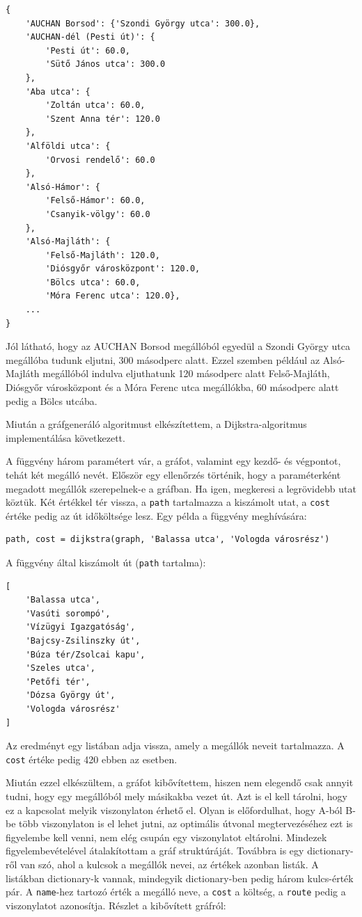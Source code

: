 \begin{verbatim}
{
    'AUCHAN Borsod': {'Szondi György utca': 300.0},
    'AUCHAN-dél (Pesti út)': {
        'Pesti út': 60.0,
        'Sütő János utca': 300.0
    },
    'Aba utca': {
        'Zoltán utca': 60.0,
        'Szent Anna tér': 120.0
    },
    'Alföldi utca': {
        'Orvosi rendelő': 60.0
    },
    'Alsó-Hámor': {
        'Felső-Hámor': 60.0,
        'Csanyik-völgy': 60.0
    },
    'Alsó-Majláth': {
        'Felső-Majláth': 120.0,
        'Diósgyőr városközpont': 120.0,
        'Bölcs utca': 60.0,
        'Móra Ferenc utca': 120.0},
    ...
}
\end{verbatim}

Jól látható, hogy az AUCHAN Borsod megállóból egyedül a Szondi György utca megállóba tudunk eljutni, 300 másodperc alatt. Ezzel szemben például az Alsó-Majláth megállóból indulva eljuthatunk 120 másodperc alatt Felső-Majláth, Diósgyőr városközpont és a Móra Ferenc utca megállókba, 60 másodperc alatt pedig a Bölcs utcába.

Miután a gráfgeneráló algoritmust elkészítettem, a Dijkstra-algoritmus implementálása következett.

A függvény három paramétert vár, a gráfot, valamint egy kezdő- és végpontot, tehát két megálló nevét. Először egy ellenőrzés történik, hogy a paraméterként megadott megállók szerepelnek-e a gráfban. Ha igen, megkeresi a legrövidebb utat köztük. Két értékkel tér vissza, a \texttt{path} tartalmazza a kiszámolt utat, a \texttt{cost} értéke pedig az út időköltsége lesz.
Egy példa a függvény meghívására:

\begin{verbatim}
path, cost = dijkstra(graph, 'Balassa utca', 'Vologda városrész')
\end{verbatim}

A függvény által kiszámolt út (\texttt{path} tartalma):

\begin{verbatim}
[
    'Balassa utca',
    'Vasúti sorompó',
    'Vízügyi Igazgatóság',
    'Bajcsy-Zsilinszky út',
    'Búza tér/Zsolcai kapu',
    'Szeles utca',
    'Petőfi tér',
    'Dózsa György út',
    'Vologda városrész'
]
\end{verbatim}

Az eredményt egy listában adja vissza, amely a megállók neveit tartalmazza. A \texttt{cost} értéke pedig 420 ebben az esetben.

Miután ezzel elkészültem, a gráfot kibővítettem, hiszen nem elegendő csak annyit tudni, hogy egy megállóból mely másikakba vezet út. Azt is el kell tárolni, hogy ez a kapcsolat melyik viszonylaton érhető el. Olyan is előfordulhat, hogy A-ból B-be több viszonylaton is el lehet jutni, az optimális útvonal megtervezéséhez ezt is figyelembe kell venni, nem elég csupán egy viszonylatot eltárolni.
Mindezek figyelembevételével átalakítottam a gráf struktúráját. Továbbra is egy dictionary-ről van szó, ahol a kulcsok a megállók nevei, az értékek azonban listák. A listákban dictionary-k vannak, mindegyik dictionary-ben pedig három kulcs-érték pár. A \texttt{name}-hez tartozó érték a megálló neve, a \texttt{cost} a költség, a \texttt{route} pedig a viszonylatot azonosítja.
Részlet a kibővített gráfról:

